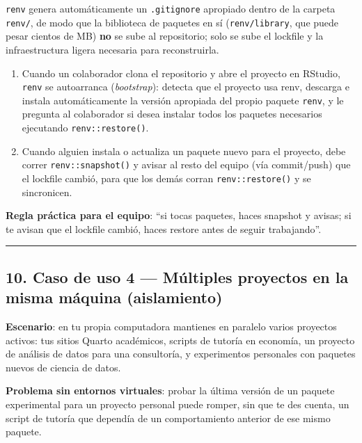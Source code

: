 \documentclass[
  man,
  floatsintext,
  longtable,
  a4paper,
  nolmodern,
  notxfonts,
  notimes,
  12pt,
  colorlinks=true,linkcolor=blue,citecolor=blue,urlcolor=blue]{apa7}
\begin{document}
\texttt{renv} genera automáticamente un \texttt{.gitignore} apropiado
dentro de la carpeta \texttt{renv/}, de modo que la biblioteca de
paquetes en sí (\texttt{renv/library}, que puede pesar cientos de MB)
\textbf{no} se sube al repositorio; solo se sube el lockfile y la
infraestructura ligera necesaria para reconstruirla.

\begin{enumerate}
\def\labelenumi{\arabic{enumi}.}
\setcounter{enumi}{2}
\item
  Cuando un colaborador clona el repositorio y abre el proyecto en
  RStudio, \texttt{renv} se autoarranca (\emph{bootstrap}): detecta que
  el proyecto usa renv, descarga e instala automáticamente la versión
  apropiada del propio paquete \texttt{renv}, y le pregunta al
  colaborador si desea instalar todos los paquetes necesarios ejecutando
  \texttt{renv::restore()}.
\item
  Cuando alguien instala o actualiza un paquete nuevo para el proyecto,
  debe correr \texttt{renv::snapshot()} y avisar al resto del equipo
  (vía commit/push) que el lockfile cambió, para que los demás corran
  \texttt{renv::restore()} y se sincronicen.
\end{enumerate}

\textbf{Regla práctica para el equipo}: ``si tocas paquetes, haces
snapshot y avisas; si te avisan que el lockfile cambió, haces restore
antes de seguir trabajando''.

\begin{center}\rule{0.5\linewidth}{0.5pt}\end{center}

\subsection{10. Caso de uso 4 --- Múltiples proyectos en la misma
máquina
(aislamiento)}\label{caso-de-uso-4-muxfaltiples-proyectos-en-la-misma-muxe1quina-aislamiento}

\textbf{Escenario}: en tu propia computadora mantienes en paralelo
varios proyectos activos: tus sitios Quarto académicos, scripts de
tutoría en economía, un proyecto de análisis de datos para una
consultoría, y experimentos personales con paquetes nuevos de ciencia de
datos.

\textbf{Problema sin entornos virtuales}: probar la última versión de un
paquete experimental para un proyecto personal puede romper, sin que te
des cuenta, un script de tutoría que dependía de un comportamiento
anterior de ese mismo paquete.
\end{document}
